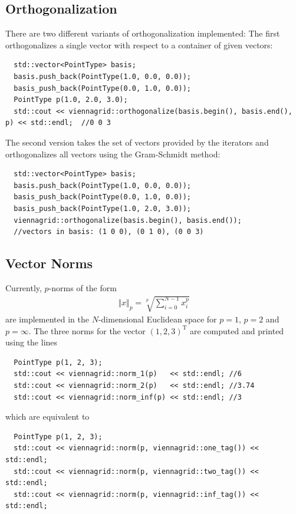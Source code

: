    \subsection{Orthogonalization}
 There are two different variants of orthogonalization implemented: The first orthogonalizes a single vector with respect to a container of given vectors:
 \begin{lstlisting}
  std::vector<PointType> basis;
  basis.push_back(PointType(1.0, 0.0, 0.0));
  basis_push_back(PointType(0.0, 1.0, 0.0));
  PointType p(1.0, 2.0, 3.0);
  std::cout << viennagrid::orthogonalize(basis.begin(), basis.end(), p) << std::endl;  //0 0 3
 \end{lstlisting}
 The second version takes the set of vectors provided by the iterators and orthogonalizes all vectors using the Gram-Schmidt method:
 \begin{lstlisting}
  std::vector<PointType> basis;
  basis.push_back(PointType(1.0, 0.0, 0.0));
  basis_push_back(PointType(0.0, 1.0, 0.0));
  basis_push_back(PointType(1.0, 2.0, 3.0));
  viennagrid::orthogonalize(basis.begin(), basis.end());
  //vectors in basis: (1 0 0), (0 1 0), (0 0 3)
 \end{lstlisting}

  \subsection{Vector Norms}
 Currently, $p$-norms of the form
  \begin{align}
   \Vert x \Vert_p = \sqrt[p]{\sum_{i=0}^{N-1} x_i^p}
  \end{align}
 are implemented in the $N$-dimensional Euclidean space for $p=1$, $p=2$ and $p=\infty$. The three norms for the vector $(1,2,3)^\mathrm{T}$ are computed and printed using the lines
 \begin{lstlisting}
  PointType p(1, 2, 3);
  std::cout << viennagrid::norm_1(p)   << std::endl; //6
  std::cout << viennagrid::norm_2(p)   << std::endl; //3.74
  std::cout << viennagrid::norm_inf(p) << std::endl; //3
 \end{lstlisting}
which are equivalent to
 \begin{lstlisting}
  PointType p(1, 2, 3);
  std::cout << viennagrid::norm(p, viennagrid::one_tag()) << std::endl;
  std::cout << viennagrid::norm(p, viennagrid::two_tag()) << std::endl;
  std::cout << viennagrid::norm(p, viennagrid::inf_tag()) << std::endl;
 \end{lstlisting}


